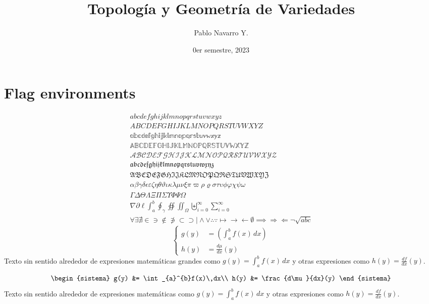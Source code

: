 \documentclass[
  toc,
  todo,
  charter,
]{apuntes}
\title{Topología y Geometría de Variedades}
\author{Pablo Navarro Y.}
\date{0er semestre, 2023}
\begin{document}
\renewcommand{\onlyinsubfile}[1]{}
\renewcommand{\notinsubfile}[1]{#1}
\maketitle

\section{Flag environments}
\begin{align}
  a b c d e f g h i j k l m n o p q r s t u v w x y z \\
  A B C D E F G H I J K L M N O P Q R S T U V W X Y Z \\
  \mathbb{a b c d e f g h i j k l m n o p q r s t u v w x y z} \\
  \mathbb{A B C D E F G H I J K L M N O P Q R S T U V W X Y Z} \\
  \mathcal{A B C D E F G H I J K L M N O P Q R S T U V W X Y Z} \\
  \mathfrak{a b c d e f g h i j k l m n o p q r s t u v w x y z} \\
  \mathfrak{A B C D E F G H I J K L M N O P Q R S T U V W X Y Z} \\
  \alpha \beta \gamma \delta \epsilon \varepsilon \zeta \eta \theta \vartheta \iota \kappa \lambda \mu \nu \xi \pi \varpi \rho \varrho \sigma \tau \upsilon \phi \varphi \chi \psi \omega \\
  \Gamma \Delta \Theta \Lambda \Xi \Pi \Sigma \Upsilon \Phi \Psi \Omega \\
  \nabla \partial \ell \int_{a}^{b} \oint_{\gamma} \oiint  \iint_{\Omega} \biguplus_{i=0}^{\infty} \sum_{i=0}^{\infty}\\
  \forall \exists \nexists \in \ni \notin \not\ni \subset \supset \mid \wedge \vee \therefore \because \mapsto \to \gets \emptyset \implies \Rightarrow \Leftarrow \neg
  \sqrt{abc}
\end{align}
\begin{equation}
  \left\lbrace
	\begin{aligned}
	  g(y) &= \left( \int_{a}^{b}f(x)\,dx \right)\\
	  h(y) &= \frac{d\mu}{dx}(y)
	\end{aligned}
  \right.
\end{equation}
Texto sin sentido alrededor de expresiones matemáticas grandes como \(g(y) = \int_{a}^{b}f(x)\,dx\) y otras expresiones como \(h(y) = \frac{df}{dx}(y)\).

\begin{definicion}[][reff]
	\begin{equation}
		\begin{sistema}
			g(y) &= \int_{a}^{b}f(x)\,dx\\
			h(y) &= \frac{d\mu}{dx}(y)
		\end{sistema}
	\end{equation}
	Texto sin sentido alrededor de expresiones matemáticas como \(g(y) = \int_{a}^{b}f(x)\,dx\) y otras expresiones como \(h(y) = \frac{df}{dx}(y)\).
	\lipsum[1]
\end{definicion}
\end{document}

